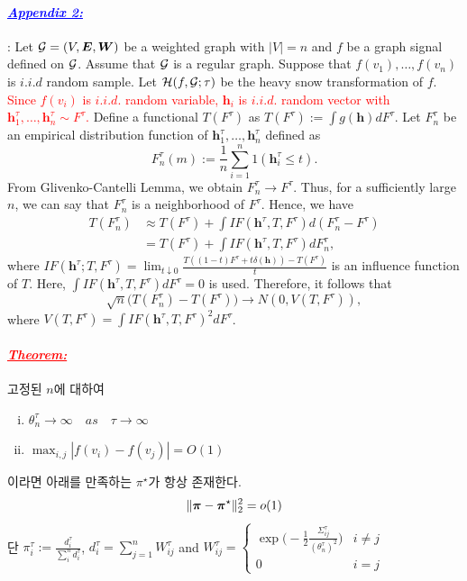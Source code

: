 \documentclass[12pt,oneside,english,a4paper]{article}
\newcommand{\parablue}[1]{\paragraph{\Large\textcolor{blue}{\it\underline{\textbf{#1:}}}}\Large}
\newcommand{\parared}[1]{\paragraph{\Large\textcolor{red}{\it\underline{\textbf{#1:}}}}\Large}
\newcommand{\bs}[1]{\mbox{\boldmath $#1$}}
\begin{document}
\parablue{Appendix 2}:
Let ${\cal G}=(V,{\boldsymbol E},{\boldsymbol W})$ be a weighted graph with $|V|=n$ and $f$ be a graph signal defined on ${\cal G}$. Assume that ${\cal G}$ is a regular graph. Suppose that $f(v_1),\dots,f(v_n)$ is $i.i.d$ random sample. Let ${\cal H}(f,{\cal G}; \tau)$ be the heavy snow transformation of $f$. \textcolor{red}{Since $f(v_i)$ is $i.i.d.$ random variable, ${\boldsymbol h}_i$ is $i.i.d.$ random vector with 
$
{\boldsymbol h}_1^{\tau},\dots,{\boldsymbol h}_n^{\tau} \sim F^{\tau}.
$}
Define a functional $T(F^{\tau})$ as 
$
T(F^{\tau}):=\int g({\boldsymbol h}) dF^{\tau}.
$
Let $F_n^{\tau}$ be an empirical distribution function of ${\boldsymbol h}_1^{\tau},\dots,{\boldsymbol h}_n^{\tau}$ defined as  
\[
F_n^{\tau}(m) :=\frac{1}{n}\sum_{i=1}^{n}1({\boldsymbol h}^{\tau}_i\leq t).
\]
From Glivenko-Cantelli Lemma,  we obtain $F_n^{\tau} \to F^{\tau}$. Thus, for a sufficiently large $n$, we can say that $F_n^{\tau}$ is a neighborhood of $F^{\tau}$. Hence, we have 
\begin{align*}
T(F_n^{\tau}) & \approx  T(F^{\tau})+\int IF(\boldsymbol{h}^{\tau},T,F^{\tau})d(F_n^{\tau}-F^{\tau}) \\
& = T(F^{\tau})+\int IF(\boldsymbol{h}^{\tau},T,F^{\tau}) dF_n^{\tau}, 
\end{align*}
where $IF({\boldsymbol h}^{\tau}; T,F^{\tau})= \lim_{t\downarrow 0}\frac{T((1-t)F^{\tau} + t \delta(\boldsymbol{h}) )-T(F^{\tau})}{t}$ is an influence function of $T$. Here, $\int IF(\boldsymbol{h}^{\tau},T,F^{\tau})dF^{\tau}=0$ is used. Therefore, it follows that  
\[
\sqrt{n}\Big(T(F_n^{\tau})-T(F^{\tau}) \Big) \to N(0,V(T,F^{\tau})), 
\]
where $V(T,F^{\tau})=\int IF(\boldsymbol{h}^{\tau},T,F^{\tau})^2 dF^{\tau}$. 

\parared{Theorem} 고정된 $n$에 대하여 
\begin{enumerate}[(i)]
\item $\theta_n^{\tau} \to \infty\quad as\quad \tau \to \infty$
\item $\max_{i,j}|f(v_i)-f(v_j)|=O(1)$
\end{enumerate}
이라면 아래를 만족하는 $\pi^{\star}$가 항상 존재한다. 
\[
\|\bs{\pi}-\bs{\pi}^{\star}\|_2^2=o(1)
\]
단 $\pi_i^{\tau}:=\frac{d_i^{\tau}}{\sum_{i}^nd_i^{\tau}}$, $d_i^{\tau}=\sum_{j=1}^{n}W_{ij}^{\tau}$ and $W_{ij}^{\tau}=\begin{cases}\exp\big(-\frac{1}{2}\frac{\Sigma_{ij}^{\tau}}{(\theta_n^{\tau})^2}\big) & i\neq j \\ 0 & i=j \end{cases}$
\end{document}
